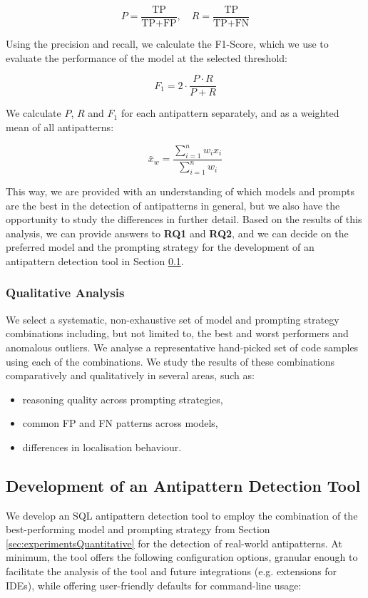 \documentclass{article}
\begin{document}
\[P = \frac{\text{TP}}{\text{TP} + \text{FP}}, \quad R = \frac{\text{TP}}{\text{TP} + \text{FN}}\]

Using the precision and recall, we calculate the F1-Score, which we use to evaluate the performance of the model at the selected threshold:

\[F_1 = 2 \cdot \frac{P \cdot R}{P + R}\]

We calculate \(P\), \(R\) and \(F_1\) for each antipattern separately, and as a weighted mean of all antipatterns:

\[\bar{x}_w = \frac{\sum_{i=1}^{n} w_i x_i}{\sum_{i=1}^{n} w_i}\]

This way, we are provided with an understanding of which models and prompts are the best in the detection of antipatterns in general, but we also have the opportunity to study the differences in further detail. Based on the results of this analysis, we can provide answers to \textbf{RQ1} and \textbf{RQ2}, and we can decide on the preferred model and the prompting strategy for the development of an antipattern detection tool in Section \ref{sec:development}.

\subsubsection{Qualitative Analysis}

We select a systematic, non-exhaustive set of model and prompting strategy combinations including, but not limited to, the best and worst performers and anomalous outliers. We analyse a representative hand-picked set of code samples using each of the combinations. We study the results of these combinations comparatively and qualitatively in several areas, such as:

\begin{itemize}
  \item reasoning quality across prompting strategies,
  \item common FP and FN patterns across models,
  \item differences in localisation behaviour.
\end{itemize}

\subsection{Development of an Antipattern Detection Tool}\label{sec:development}

We develop an SQL antipattern detection tool to employ the combination of the best-performing model and prompting strategy from Section \ref{sec:experimentsQuantitative} for the detection of real-world antipatterns. At minimum, the tool offers the following configuration options, granular enough to facilitate the analysis of the tool and future integrations (e.g. extensions for IDEs), while offering user-friendly defaults for command-line usage:
\end{document}

